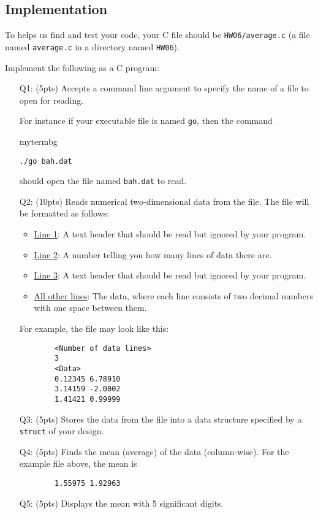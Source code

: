 \subsection*{Implementation}
\begin{tcolorbox}[width=\textwidth,colback=green]
To helps us find and test your code, your C file should be \texttt{HW06/average.c} (a file named \texttt{average.c} in a directory named \texttt{HW06}).
\end{tcolorbox}
Implement the following as a C program:
\begin{enumerate}
    \item[Q1:] (5pts) Accepts a command line argument to specify the name of a file to open for reading.
    
    For instance if your executable file is named \texttt{go}, then the command
    \begin{tsession}{mytermbg}
    \begin{verbatim}
./go bah.dat\end{verbatim}
    \end{tsession}
    should open the file named \texttt{bah.dat} to read.
   
    \item[Q2:] (10pts) Reads numerical two-dimensional data from the file.
    The file will be formatted as follows:
    \begin{itemize}
        \item \underline{Line 1}: A text header that should be read but ignored by your program.
        \item \underline{Line 2}: A number telling you how many lines of data there are.
        \item \underline{Line 3}: A text header that should be read but ignored by your program.
        \item \underline{All other lines}: The data, where each line consists of two decimal numbers with one space between them.
    \end{itemize}
    For example, the file may look like this:
    \begin{verbatim}
        <Number of data lines>
        3
        <Data>
        0.12345 6.78910
        3.14159 -2.0002
        1.41421 0.99999
    \end{verbatim}
    \item[Q3:] (5pts) Stores the data from the file into a data structure specified by a \texttt{struct} of your design. 
    \item[Q4:] (5pts) Finds the mean (average) of the data (column-wise).
    For the example file above, the mean is
    \begin{verbatim}
        1.55975 1.92963
    \end{verbatim}
    \item[Q5:] (5pts) Displays the mean with 5 significant digits.
\end{enumerate}

